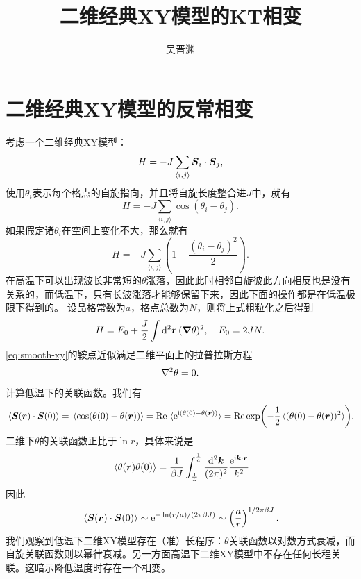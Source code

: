 \documentclass[hyperref, UTF8, a4paper]{ctexart}
\title{二维经典XY模型的KT相变}
\author{吴晋渊}
\newcommand*{\ii}{\mathrm{i}}
\newcommand*{\ee}{\mathrm{e}}
\newcommand*{\pair}[1]{\langle #1 \rangle}
\begin{document}
\maketitle

\section{二维经典XY模型的反常相变}

考虑一个二维经典XY模型：
\begin{equation}
    H = - J \sum_{\pair{i, j}} \vb*{S}_i \cdot \vb*{S}_j,
\end{equation}
使用$\theta_i$表示每个格点的自旋指向，并且将自旋长度整合进$J$中，就有
\begin{equation}
    H = - J \sum_{\pair{i, j}} \cos(\theta_i - \theta_j).
\end{equation}
如果假定诸$\theta_i$在空间上变化不大，那么就有
\[
    H = - J \sum_{\pair{i, j}} \left( 1 - \frac{(\theta_i - \theta_j)^2}{2} \right).
\]
在高温下可以出现波长非常短的$\theta$涨落，因此此时相邻自旋彼此方向相反也是没有关系的，而低温下，只有长波涨落才能够保留下来，因此下面的操作都是在低温极限下得到的。
设晶格常数为$a$，格点总数为$N$，则将上式粗粒化之后得到
\begin{equation}
    H = E_0 + \frac{J}{2} \int \dd[2]{\vb*{r}} (\grad{\theta})^2, \quad E_0 = 2 J N.
    \label{eq:smooth-xy}
\end{equation}
\eqref{eq:smooth-xy}的鞍点近似满足二维平面上的拉普拉斯方程
\begin{equation}
    \laplacian{\theta} = 0.
\end{equation}

计算低温下的关联函数。我们有
\[
    \expval*{\vb*{S}(\vb*{r}) \cdot \vb*{S}(0)} = \expval*{\cos(\theta(0) - \theta(\vb*{r}))} = \Re \expval*{\ee^{\ii (\theta(0) - \theta(\vb*{r}))}} = \Re \exp(-\frac{1}{2} \expval*{(\theta(0) - \theta(\vb*{r}))^2}).
\]
二维下$\theta$的关联函数正比于$\ln r$，具体来说是
\[
    \expval*{\theta(\vb*{r}) \theta(0)} = \frac{1}{\beta J} \int_{\frac{1}{L}}^{\frac{1}{a}} \frac{\dd[2]{\vb*{k}}}{(2\pi)^2} \frac{\ee^{\ii \vb*{k} \cdot \vb*{r}}}{k^2} 
\]
因此
\begin{equation}
    \expval*{\vb*{S}(\vb*{r}) \cdot \vb*{S}(0)} \sim \ee^{- \ln (r/a) / (2 \pi \beta J)} \sim \left(\frac{a}{r}\right)^{1/2\pi \beta J}.
\end{equation}
我们观察到低温下二维XY模型存在（准）长程序：$\theta$关联函数以对数方式衰减，而自旋关联函数则以幂律衰减。另一方面高温下二维XY模型中不存在任何长程关联。这暗示降低温度时存在一个相变。
\end{document}
